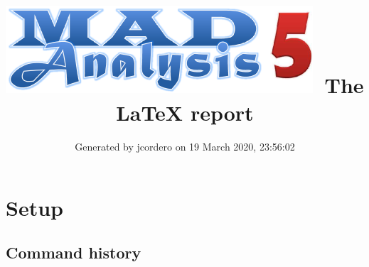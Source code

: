 \documentclass[a4paper, 10pt]{article}
\title{{\includegraphics[scale=.4]{logo.png}}\ The LaTeX report}
\author{Generated by jcordero on 19 March 2020, 23:56:02}
\begin{document}
\maketitle
\flushbottom

\newpage
\section{ Setup}

\subsection{ Command history}
\end{document}
